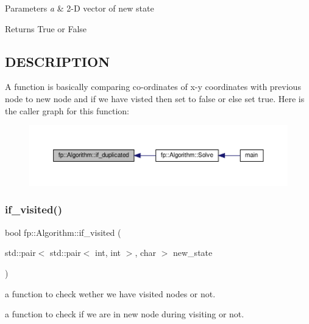 \begin{DoxyParams}{Parameters}
{\em a} & 2-\/D vector of new state \\
\hline
\end{DoxyParams}
\begin{DoxyReturn}{Returns}
True or False 
\end{DoxyReturn}
\hypertarget{_m_a_z_e_8h_DESCRIPTION}{}\subsection{D\+E\+S\+C\+R\+I\+P\+T\+I\+ON}\label{_m_a_z_e_8h_DESCRIPTION}
A function is basically comparing co-\/ordinates of x-\/y coordinates with previous node to new node and if we have visted then set to false or else set true. Here is the caller graph for this function\+:
\nopagebreak
\begin{figure}[H]
\begin{center}
\leavevmode
\includegraphics[width=350pt]{classfp_1_1_algorithm_a92571327e87248eb1afc706d571e47e0_icgraph}
\end{center}
\end{figure}
\mbox{\label{classfp_1_1_algorithm_aa7083be9be18b81bedf9bcc9976e97af}} 
\subsubsection{\texorpdfstring{if\+\_\+visited()}{if\_visited()}}
{\footnotesize\ttfamily bool fp\+::\+Algorithm\+::if\+\_\+visited (\begin{DoxyParamCaption}\item[{std\+::pair$<$ std\+::pair$<$ int, int $>$, char $>$}]{new\+\_\+state }\end{DoxyParamCaption})}



a function to check wether we have visited nodes or not. 

a function to check if we are in new node during visiting or not.


